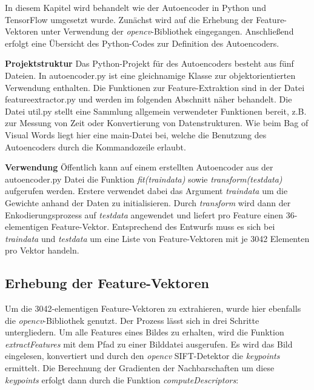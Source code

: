 In diesem Kapitel wird behandelt wie der Autoencoder in Python und TensorFlow umgesetzt wurde. Zunächst wird auf die Erhebung der Feature-Vektoren unter Verwendung der \textit{opencv}-Bibliothek eingegangen. Anschließend erfolgt eine Übersicht des Python-Codes zur Definition des Autoencoders.

\textbf{Projektstruktur} Das Python-Projekt für des Autoencoders besteht aus fünf Dateien. In autoencoder.py ist eine gleichnamige Klasse zur objektorientierten Verwendung enthalten. Die Funktionen zur Feature-Extraktion sind in der Datei feature\textunderscore extractor.py und werden im folgenden Abschnitt näher behandelt. Die Datei util.py stellt eine Sammlung allgemein verwendeter Funktionen bereit, z.B. zur Messung von Zeit oder Konvertierung von Datenstrukturen. Wie beim Bag of Visual Words liegt hier eine main-Datei bei, welche die Benutzung des Autoencoders durch die Kommandozeile erlaubt.


\textbf{Verwendung} Öffentlich kann auf einem erstellten Autoencoder aus der autoencoder.py Datei die Funktion \textit{fit(train\textunderscore data)} sowie \textit{transform(test\textunderscore data)} aufgerufen werden. Erstere verwendet dabei das Argument \textit{train\textunderscore data} um die Gewichte anhand der Daten zu initialisieren.  Durch \textit{transform} wird dann der Enkodierungsprozess auf \textit{test\textunderscore data} angewendet und liefert pro Feature einen 36-elementigen Feature-Vektor. Entsprechend des Entwurfs muss es sich bei \textit{train\textunderscore data} und \textit{test\textunderscore data} um eine Liste von Feature-Vektoren mit je 3042 Elementen pro Vektor handeln.

\subsection{Erhebung der Feature-Vektoren}

Um die 3042-elementigen Feature-Vektoren zu extrahieren, wurde hier ebenfalls die \textit{opencv}-Bibliothek genutzt. Der Prozess lässt sich in drei Schritte untergliedern. Um alle Features eines Bildes zu erhalten, wird die Funktion \textit{extractFeatures} mit dem Pfad zu einer Bilddatei ausgerufen. Es wird das Bild eingelesen, konvertiert und durch den \textit{opencv} SIFT-Detektor die \textit{keypoints} ermittelt. Die Berechnung der Gradienten der Nachbarschaften um diese \textit{keypoints} erfolgt dann durch die Funktion \textit{computeDescriptors}:

